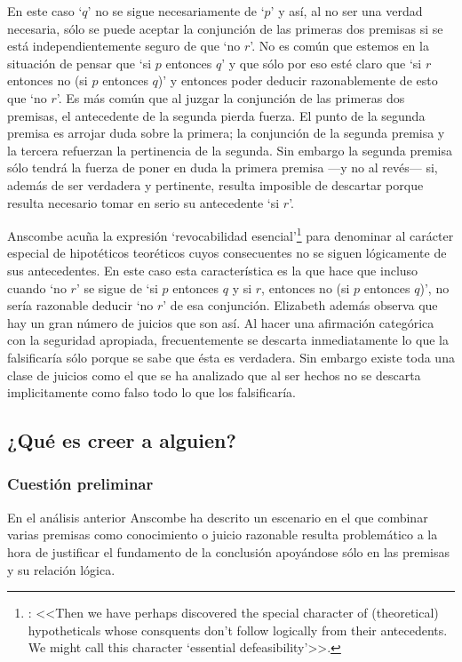   En este caso `$q$' no se sigue necesariamente de `$p$' y así, al no ser una
  verdad necesaria, sólo se puede aceptar la conjunción de las primeras dos
  premisas si se está independientemente seguro de que `no $r$'. No es común que
  estemos en la situación de pensar que `si $p$ entonces $q$' y que sólo por eso
  esté claro que `si $r$ entonces no (si $p$ entonces $q$)' y entonces poder
  deducir razonablemente de esto que `no $r$'. Es más común que al juzgar la
  conjunción de las primeras dos premisas, el antecedente de la segunda pierda
  fuerza. El punto de la segunda premisa es arrojar duda sobre la primera; la
  conjunción de la segunda premisa y la tercera refuerzan la pertinencia de la
  segunda. Sin embargo la segunda premisa sólo tendrá la fuerza de poner en duda
  la primera premisa ---y no al revés--- si, además de ser verdadera y
  pertinente, resulta imposible de descartar porque resulta necesario tomar en
  serio su antecedente `si $r$'\autocite[Cf.~][301]{anscombe2015logic:qpa}.

  Anscombe acuña la expresión `revocabilidad
  esencial'\footnote{\cite[Cf.~][301]{anscombe2015logic:qpa}: <<Then we have
    perhaps discovered the special character of (theoretical) hypotheticals
    whose consquents don't follow logically from their antecedents. We might
    call this character `essential defeasibility'>>.} para denominar al carácter
  especial de hipotéticos teoréticos cuyos consecuentes no se siguen lógicamente
  de sus antecedentes. En este caso esta característica es la que hace que
  incluso cuando `no $r$' se sigue de `si $p$ entonces $q$ y si $r$, entonces no
  (si $p$ entonces $q$)', no sería razonable deducir `no $r$' de esa conjunción.
  Elizabeth además observa que hay un gran número de juicios que son así. Al
  hacer una afirmación categórica con la seguridad apropiada, frecuentemente se
  descarta inmediatamente lo que la falsificaría sólo porque se sabe que ésta es
  verdadera. Sin embargo existe toda una clase de juicios como el que se ha
  analizado que al ser hechos no se descarta implicitamente como falso todo lo
  que los falsificaría\autocite[Cf.~][302]{anscombe2015logic:qpa}.

\subsection{¿Qué es creer a alguien?}

\subsubsection{Cuestión preliminar}
En el análisis anterior Anscombe ha descrito un escenario en el que combinar
varias premisas como conocimiento o juicio razonable resulta problemático a la
hora de justificar el fundamento de la conclusión apoyándose sólo en las
premisas y su relación lógica.

